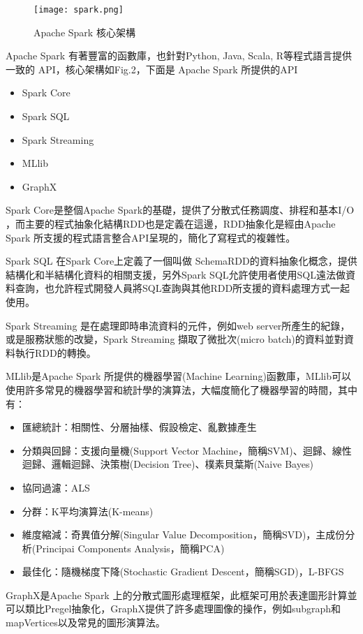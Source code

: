 \begin{figure}[h]
\centering
\graphicspath{{/Users/FUDA/Documents/latex/masterThesis/image/}}
\texttt{[image: spark.png]}
\caption{Apache Spark 核心架構}
\end{figure}
\newpage
Apache Spark 有著豐富的函數庫，也針對Python, Java, Scala, R等程式語言提供一致的 API，核心架構如Fig.2，下面是 Apache Spark 所提供的API
\begin{itemize}
\item Spark Core
\item Spark SQL
\item Spark Streaming
\item MLlib
\item GraphX
\end{itemize}
Spark Core是整個Apache Spark的基礎，提供了分散式任務調度、排程和基本I/O ，而主要的程式抽象化結構RDD也是定義在這邊，RDD抽象化是經由Apache Spark 所支援的程式語言整合API呈現的，簡化了寫程式的複雜性。\\\par
Spark SQL 在Spark Core上定義了一個叫做 SchemaRDD的資料抽象化概念，提供結構化和半結構化資料的相關支援，另外Spark SQL允許使用者使用SQL遠法做資料查詢，也允許程式開發人員將SQL查詢與其他RDD所支援的資料處理方式一起使用。\\\par
Spark Streaming 是在處理即時串流資料的元件，例如web server所產生的紀錄，或是服務狀態的改變，Spark Streaming 擷取了微批次(micro batch)的資料並對資料執行RDD的轉換。\\\par
MLlib是Apache Spark 所提供的機器學習(Machine Learning)函數庫，MLlib可以使用許多常見的機器學習和統計學的演算法，大幅度簡化了機器學習的時間，其中有：
\begin{itemize}
\item 匯總統計：相關性、分層抽樣、假設檢定、亂數據產生
\item 分類與回歸：支援向量機(Support Vector Machine，簡稱SVM)、迴歸、線性迴歸、邏輯迴歸、決策樹(Decision Tree)、樸素貝葉斯(Naive Bayes)
\item 協同過濾：ALS 
\item 分群：K平均演算法(K-means)
\item 維度縮減：奇異值分解(Singular Value Decomposition，簡稱SVD)，主成份分析(Principai Components Analysis，簡稱PCA)
\item 最佳化：隨機梯度下降(Stochastic Gradient Descent，簡稱SGD)，L-BFGS
\end{itemize}
GraphX是Apache Spark 上的分散式圖形處理框架，此框架可用於表達圖形計算並可以類比Pregel抽象化，GraphX提供了許多處理圖像的操作，例如subgraph和mapVertices以及常見的圖形演算法。

